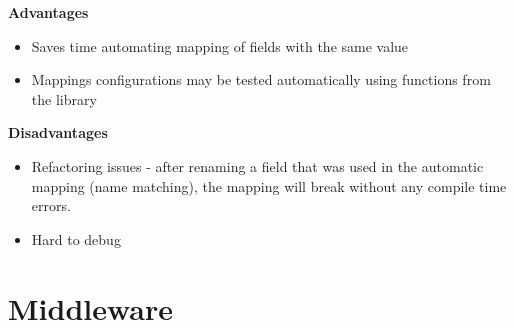 \textbf{Advantages}
\begin{itemize}
    \item Saves time automating mapping of fields with the same value
    \item Mappings configurations may be tested automatically using functions from the library
\end{itemize}
\textbf{Disadvantages}
\begin{itemize}
    \item Refactoring issues - after renaming a field that was used in the automatic mapping (name matching), the mapping will break without any compile time errors.
    \item Hard to debug
\end{itemize}

\section{Middleware}
